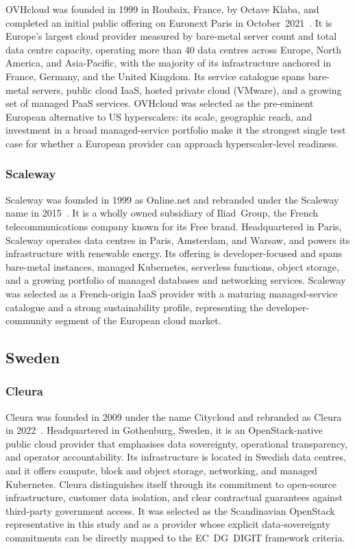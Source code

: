 OVHcloud was founded in 1999 in Roubaix, France, by Octave Klaba, and completed an initial public offering on Euronext Paris in October~2021~\cite{OVHcloud_IPO}. It is Europe's largest cloud provider measured by bare-metal server count and total data centre capacity, operating more than 40 data centres across Europe, North America, and Asia-Pacific, with the majority of its infrastructure anchored in France, Germany, and the United Kingdom. Its service catalogue spans bare-metal servers, public cloud IaaS, hosted private cloud (VMware), and a growing set of managed PaaS services. OVHcloud was selected as the pre-eminent European alternative to US hyperscalers: its scale, geographic reach, and investment in a broad managed-service portfolio make it the strongest single test case for whether a European provider can approach hyperscaler-level readiness.

\subsubsection{Scaleway}

Scaleway was founded in 1999 as Online.net and rebranded under the Scaleway name in 2015~\cite{Scaleway_About}. It is a wholly owned subsidiary of Iliad~Group, the French telecommunications company known for its Free brand. Headquartered in Paris, Scaleway operates data centres in Paris, Amsterdam, and Warsaw, and powers its infrastructure with renewable energy. Its offering is developer-focused and spans bare-metal instances, managed Kubernetes, serverless functions, object storage, and a growing portfolio of managed databases and networking services. Scaleway was selected as a French-origin IaaS provider with a maturing managed-service catalogue and a strong sustainability profile, representing the developer-community segment of the European cloud market.

\subsection{Sweden}

\subsubsection{Cleura}

Cleura was founded in 2009 under the name Citycloud and rebranded as Cleura in 2022~\cite{Cleura_About}. Headquartered in Gothenburg, Sweden, it is an OpenStack-native public cloud provider that emphasises data sovereignty, operational transparency, and operator accountability. Its infrastructure is located in Swedish data centres, and it offers compute, block and object storage, networking, and managed Kubernetes. Cleura distinguishes itself through its commitment to open-source infrastructure, customer data isolation, and clear contractual guarantees against third-party government access. It was selected as the Scandinavian OpenStack representative in this study and as a provider whose explicit data-sovereignty commitments can be directly mapped to the EC~DG~DIGIT framework criteria.

